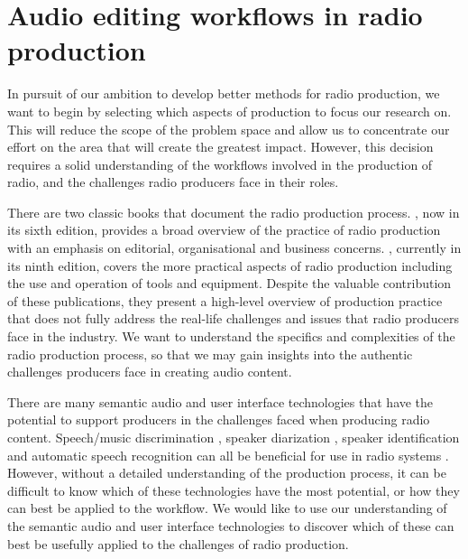 \chapter{Audio editing workflows in radio production}\label{chp:ethno}


In pursuit of our ambition to develop better methods for radio production, we want to begin by selecting which aspects
of production to focus our research on. This will reduce the scope of the problem space and allow us to concentrate our
effort on the area that will create the greatest impact.  However, this decision requires a solid understanding of the
workflows involved in the production of radio, and the challenges radio producers face in their roles.


There are two classic books that document the radio production process. \citet{McLeish2015}, now in its sixth edition,
provides a broad overview of the practice of radio production with an emphasis on editorial, organisational and
business concerns.  \citet{Hausman2012}, currently in its ninth edition, covers the more practical aspects of radio
production including the use and operation of tools and equipment.  Despite the valuable contribution of these
publications, they present a high-level overview of production practice that does not fully address the real-life
challenges and issues that radio producers face in the industry.  We want to understand the specifics and complexities
of the radio production process, so that we may gain insights into the authentic challenges producers face in creating
audio content.


There are many semantic audio and user interface technologies that have the potential to support producers in the
challenges faced when producing radio content. Speech/music discrimination \citep{Wieser2014}, speaker diarization
\citep{AngueraMiro2012}, speaker identification \citep{Lee1999a} and automatic speech recognition \citep{Junqua1995}
can all be beneficial for use in radio systems \citep{Raimond2014,Bell2015}.  However, without a detailed understanding
of the production process, it can be difficult to know which of these technologies have the most potential, or how they
can best be applied to the workflow.
We would like to use our understanding of the semantic audio and user interface technologies to discover which of these
can best be usefully applied to the challenges of radio production.

